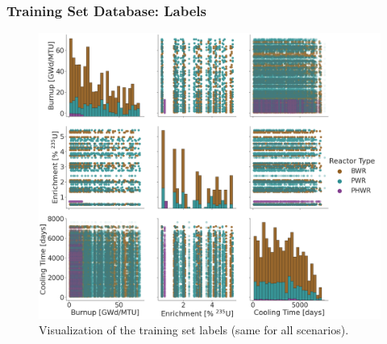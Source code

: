 \begin{frame}
  \frametitle{Training Set Database: Labels}
  \begin{figure}
    \centering
      \includegraphics[height=0.8\textheight]{./figures/histogram_scatter_trainset_viz.png}
      \caption{Visualization of the training set labels (same for all scenarios).}
  \end{figure}
\end{frame}

